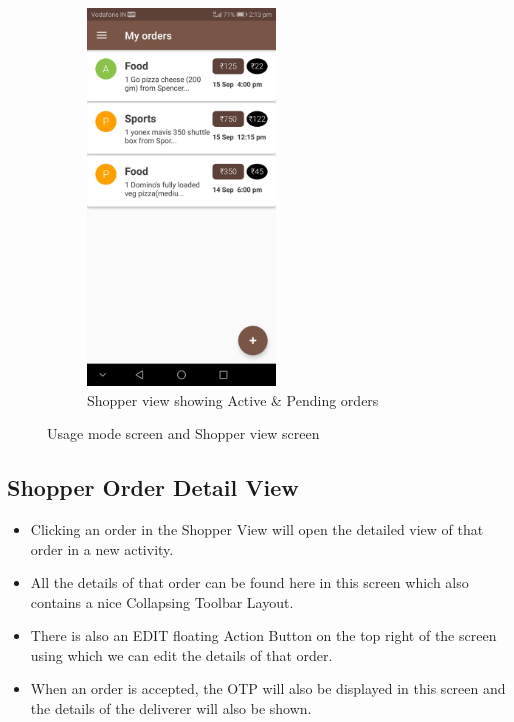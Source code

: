 \documentclass{report}
\begin{document}
\begin{figure}[h!]
\begin{subfigure}[b]{.3\textwidth}
\includegraphics[width=5cm]{shopper_view.jpg}
\caption{\centering Shopper view showing Active \& Pending orders}
\end{subfigure}
\caption{Usage mode screen and Shopper view screen} 
\label{fig:NASA_Logo}
\end{figure}



\subsection{Shopper Order Detail View}
\begin{itemize}
\item Clicking an order in the Shopper View will open the detailed view of that order in a new activity.
\item All the details of that order can be found here in this screen which also contains a nice Collapsing Toolbar Layout.
\item There is also an EDIT floating Action Button on the top right of the screen using which we can edit the details of that order.
\item When an order is accepted, the OTP will also be displayed in this screen and the details of the deliverer will also be shown.
\end{itemize}
\end{document}
